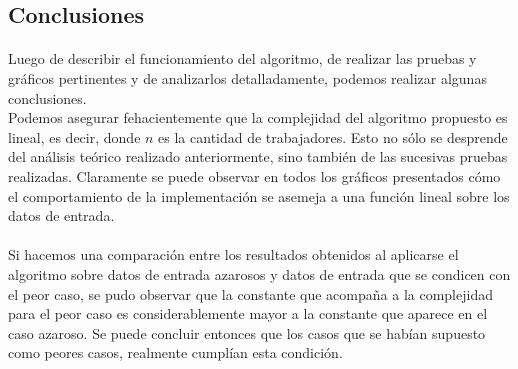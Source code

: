 \subsection{Conclusiones}
\paragraph{}
Luego de describir el funcionamiento del algoritmo, de realizar las pruebas y gráficos pertinentes y de analizarlos detalladamente, podemos realizar algunas conclusiones.\\
Podemos asegurar fehacientemente que la complejidad del algoritmo propuesto es lineal, es decir,  donde $n$ es la cantidad de trabajadores. Esto no sólo se desprende del análisis teórico realizado anteriormente, sino también de las sucesivas pruebas realizadas. Claramente se puede observar en todos los gráficos presentados cómo el comportamiento de la implementación se asemeja a una función lineal sobre los datos de entrada.

\paragraph{}
Si hacemos una comparación entre los resultados obtenidos al aplicarse el algoritmo sobre datos de entrada azarosos y datos de entrada que se condicen con el peor caso, se pudo observar que la constante que acompaña a la complejidad para el peor caso es considerablemente mayor a la constante que aparece en el caso azaroso. Se puede concluir entonces que los casos que se habían supuesto como peores casos, realmente cumplían esta condición. 